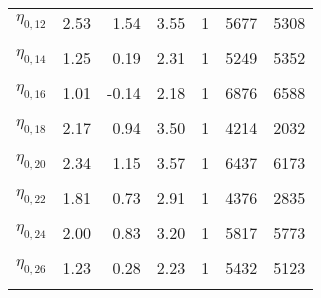 \begin{longtable}[t]{lrrrrrr}
$\eta_{0, 12}$ & 2.53 & 1.54 & 3.55 & 1 & 5677 & 5308\\
\cellcolor{gray!6}{$\eta_{0, 13}$} & \cellcolor{gray!6}{2.22} & \cellcolor{gray!6}{1.29} & \cellcolor{gray!6}{3.15} & \cellcolor{gray!6}{1} & \cellcolor{gray!6}{5564} & \cellcolor{gray!6}{4966}\\
$\eta_{0, 14}$ & 1.25 & 0.19 & 2.31 & 1 & 5249 & 5352\\
\cellcolor{gray!6}{$\eta_{0, 15}$} & \cellcolor{gray!6}{1.15} & \cellcolor{gray!6}{0.26} & \cellcolor{gray!6}{2.06} & \cellcolor{gray!6}{1} & \cellcolor{gray!6}{6167} & \cellcolor{gray!6}{5103}\\
$\eta_{0, 16}$ & 1.01 & -0.14 & 2.18 & 1 & 6876 & 6588\\
\cellcolor{gray!6}{$\eta_{0, 17}$} & \cellcolor{gray!6}{1.64} & \cellcolor{gray!6}{0.80} & \cellcolor{gray!6}{2.50} & \cellcolor{gray!6}{1} & \cellcolor{gray!6}{6554} & \cellcolor{gray!6}{6604}\\
$\eta_{0, 18}$ & 2.17 & 0.94 & 3.50 & 1 & 4214 & 2032\\
\cellcolor{gray!6}{$\eta_{0, 19}$} & \cellcolor{gray!6}{1.52} & \cellcolor{gray!6}{0.75} & \cellcolor{gray!6}{2.30} & \cellcolor{gray!6}{1} & \cellcolor{gray!6}{5041} & \cellcolor{gray!6}{4290}\\
$\eta_{0, 20}$ & 2.34 & 1.15 & 3.57 & 1 & 6437 & 6173\\
\cellcolor{gray!6}{$\eta_{0, 21}$} & \cellcolor{gray!6}{3.15} & \cellcolor{gray!6}{2.30} & \cellcolor{gray!6}{4.02} & \cellcolor{gray!6}{1} & \cellcolor{gray!6}{4752} & \cellcolor{gray!6}{2725}\\
$\eta_{0, 22}$ & 1.81 & 0.73 & 2.91 & 1 & 4376 & 2835\\
\cellcolor{gray!6}{$\eta_{0, 23}$} & \cellcolor{gray!6}{2.25} & \cellcolor{gray!6}{0.91} & \cellcolor{gray!6}{3.53} & \cellcolor{gray!6}{1} & \cellcolor{gray!6}{5348} & \cellcolor{gray!6}{5857}\\
$\eta_{0, 24}$ & 2.00 & 0.83 & 3.20 & 1 & 5817 & 5773\\
\cellcolor{gray!6}{$\eta_{0, 25}$} & \cellcolor{gray!6}{2.99} & \cellcolor{gray!6}{2.01} & \cellcolor{gray!6}{3.99} & \cellcolor{gray!6}{1} & \cellcolor{gray!6}{5715} & \cellcolor{gray!6}{5483}\\
$\eta_{0, 26}$ & 1.23 & 0.28 & 2.23 & 1 & 5432 & 5123\\
\cellcolor{gray!6}{$\eta_{0, 27}$} & \cellcolor{gray!6}{1.39} & \cellcolor{gray!6}{0.56} & \cellcolor{gray!6}{2.27} & \cellcolor{gray!6}{1} & \cellcolor{gray!6}{5165} & \cellcolor{gray!6}{4639}\\

\end{longtable}
